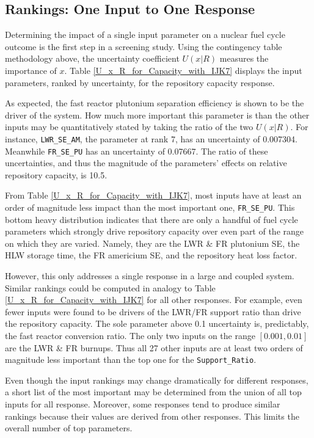 \documentclass[preprint,12pt]{elsarticle}
\begin{document}
\subsection{Rankings: One Input to One Response}
\label{sec:rank2D}

Determining the impact of a single input parameter on a nuclear fuel cycle outcome is the first step in a screening study.  Using the contingency table methodology above,
the uncertainty coefficient $U(x|R)$ measures the importance of $x$.  Table \ref{U_x_R_for_Capacity_with_IJK7} displays the input parameters, ranked by
uncertainty, for the repository capacity response.

%


As expected, the fast reactor plutonium separation efficiency is shown to be the driver of the system.  How much more important this parameter is than the
other inputs may be quantitatively stated by taking the ratio of the two $U(x|R)$.  For instance, \texttt{LWR\_SE\_AM}, the parameter at rank 7,
has an uncertainty of 0.007304.  Meanwhile \texttt{FR\_SE\_PU} has an uncertainty of 0.07667.  The ratio of these uncertainties,
and thus the magnitude of the parameters' effects on relative repository capacity, is 10.5.

From Table \ref{U_x_R_for_Capacity_with_IJK7}, most inputs have at least an order of magnitude less impact than the most important one, \texttt{FR\_SE\_PU}.
This bottom heavy distribution indicates that there are only a handful of fuel cycle parameters which strongly drive
repository capacity over even part of the range on which they are varied.
Namely, they are the LWR \& FR plutonium SE, the HLW storage time, the FR americium SE, and the repository heat loss factor.

However, this only addresses a single response in a large and coupled system.
Similar rankings could be computed in analogy to Table \ref{U_x_R_for_Capacity_with_IJK7} for all other responses.
For example, even fewer inputs were found to be drivers of the LWR/FR support ratio than drive the repository capacity.  The sole parameter above 0.1 uncertainty is, predictably, the fast reactor conversion ratio.
The only two inputs on the range $[0.001, 0.01]$ are the LWR \& FR burnups.  Thus all 27 other inputs are at least two orders of magnitude
less important than the top one for the \texttt{Support\_Ratio}.

Even though the input rankings may change dramatically for different responses, a short list of the most important may be determined from the union of all top
inputs for all response.  Moreover, some responses tend to produce similar rankings because their values are derived from other responses.
This limits the overall number of top parameters.
\end{document}
